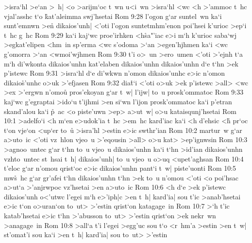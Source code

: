 >isra`hl
>e`an
>~h|
<o
>arijm`oc
t~wn
u<i~wn
>isra`hl
<wc
<h
>'ammoc
t~hc
vjal'asshc
t`o
\r{k}at'aleimma
swj'hsetai\bibvsend
\vs Rom 9:28
l'ogon
g`ar
suntel~wn
ka`i
sunt'emnwn
>en\r{}
dikaios'unh|
<'oti
l'ogon
suntetmhm'enon
poi'hsei
k'urioc
>ep`i
t~hc
g~hc\bibvsend
\vs Rom 9:29
ka`i
kaj`wc
proe'irhken
<h\r{s}a"'iac
e>i
m`h
k'urioc
saba`wj
>egkat'elipen
<hm~in
sp'erma
<wc
s'odoma
>`an
>egen'hjhmen
ka`i
<wc
g'omorra
>`an
<wmoi'wjhmen\bibvsend
\vs Rom 9:30
t'i
o>~un
>ero~umen
<'oti
>'ejnh
t`a
m`h
di'wkonta
dikaios'unhn
kat'elaben
dikaios'unhn
dikaios'unhn
d`e
t`hn
>ek
p'istewc\bibvsend
\vs Rom 9:31
>isra`hl
d`e
di'wkwn
n'omon
dikaios'unhc
e>ic
n'omon
dikaio\r{s}'unhc
o>uk
>'efjasen\bibvsend
\vs Rom 9:32
dia\r{t}`i
<'oti
o>uk
>ek
p'istewc
>all>
<wc
>ex
>'ergwn
n'omou\r{}
pros'ekoyan
g`ar
t~w|
l'ijw|
to~u
prosk'ommatoc\bibvsend
\vs Rom 9:33
kaj`wc
g'egraptai
>ido`u
t'ijhmi
>en
si`wn
l'ijon
prosk'ommatoc
ka`i
p'etran
skand'alou
ka`i
\r{p}~ac
<o
piste'uwn
>ep>
a>ut~w|
o>u
kataisqunj'hsetai\bibvsend
\vs Rom 10:1
>adelfo`i
<h
m`en
e>udok'ia
t~hc
>em~hc
kard'iac
ka`i
<h
d'ehsic
<h\r{}
pr`oc
t`on
vje`on
<up`er
to~u\r{}
>isra'hl
>estin
e>ic
swthr'ian\bibvsend
\vs Rom 10:2
martur~w
g`ar
a>uto~ic
<'oti
vz~hlon
vjeo~u
>'eqousin
>all>
o>u
kat>
>ep'ignwsin\bibvsend
\vs Rom 10:3
>agnoo~untec
g`ar
t`hn
to~u
vjeo~u
dikaios'unhn
ka`i
t`hn
>id'ian
dikaios'unhn
vzhto~untec
st~hsai
t~h|
dikaios'unh|
to~u
vjeo~u
o>uq
<upet'aghsan\bibvsend
\vs Rom 10:4
t'eloc
g`ar
n'omou
qrist`oc
e>ic
dikaios'unhn
pant`i
t~w|
piste'uonti\bibvsend
\vs Rom 10:5
mw\r{s}~hc
g`ar
gr'afei
t`hn
dikaios'unhn
t`hn
>ek
to~u
n'omou
<'oti
<o
poi'hsac
a>ut`a
>'anjrwpoc
vz'hsetai
>en
a>uto~ic\bibvsend
\vs Rom 10:6
<h
d`e
>ek
p'istewc
dikaios'unh
o<'utwc
l'egei
m`h
e>'iph|c
>en
t~h|
kard'ia|
sou
t'ic
>anab'hsetai
e>ic
t`on
o>uran`on
to~ut>
>'estin
qrist`on
katagage~in\bibvsend
\vs Rom 10:7
>`h
t'ic
katab'hsetai
e>ic
t`hn
>'abusson
to~ut>
>'estin
qrist`on
>ek
nekr~wn
>anagage~in\bibvsend
\vs Rom 10:8
>all`a
t'i
l'egei
>egg'uc
sou
t`o
<r~hm'a
>estin
>en
t~w|
st'omat'i
sou
ka`i
>en
t~h|
kard'ia|
sou
to~ut>
>'estin
